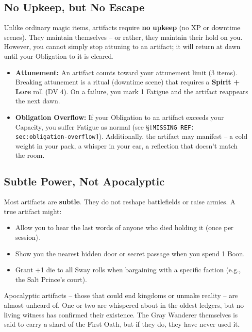 \subsection{No Upkeep, but No Escape}

Unlike ordinary magic items, artifacts require \textbf{no upkeep} (no XP or downtime scenes). They maintain themselves -- or rather, they maintain their hold on you. However, you cannot simply stop attuning to an artifact; it will return at dawn until your Obligation to it is cleared.

\begin{itemize}
  \item \textbf{Attunement:} An artifact counts toward your attunement limit (3 items). Breaking attunement is a ritual (downtime scene) that requires a \textbf{Spirit + Lore} roll (DV 4). On a failure, you mark 1 Fatigue and the artifact reappears the next dawn.
  \item \textbf{Obligation Overflow:} If your Obligation to an artifact exceeds your Capacity, you suffer Fatigue as normal (see \S\texttt{[MISSING REF: sec:obligation-overflow]}). Additionally, the artifact may manifest -- a cold weight in your pack, a whisper in your ear, a reflection that doesn't match the room.
\end{itemize}

\subsection{Subtle Power, Not Apocalyptic}

Most artifacts are \textbf{subtle}. They do not reshape battlefields or raise armies. A true artifact might:

\begin{itemize}
  \item Allow you to hear the last words of anyone who died holding it (once per session).
  \item Show you the nearest hidden door or secret passage when you spend 1 Boon.
  \item Grant +1 die to all Sway rolls when bargaining with a specific faction (e.g., the Salt Prince's court).
\end{itemize}

Apocalyptic artifacts -- those that could end kingdoms or unmake reality -- are almost unheard of. One or two are whispered about in the oldest ledgers, but no living witness has confirmed their existence. The Gray Wanderer themselves is said to carry a shard of the First Oath, but if they do, they have never used it.

